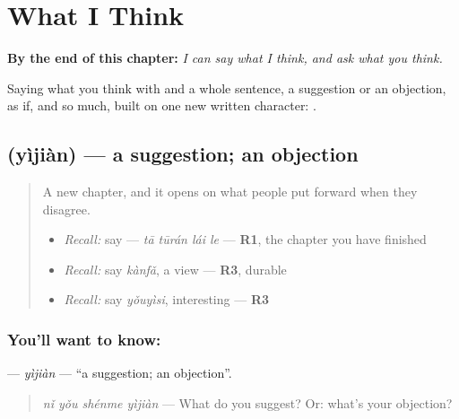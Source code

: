 
\chapter{What I Think}
\label{ch:zh-what-i-think}

\begin{chapteropening}
\textbf{By the end of this chapter:} \emph{I can say what I think, and ask what you think.}

Saying what you think with  and a whole sentence, a suggestion or an objection, as if, and so much, built on one new written character: .
\end{chapteropening}

\section[\texorpdfstring{\zh{意见} (yìjiàn)}{意见 (yìjiàn)}]{ (yìjiàn) — a suggestion; an objection}

\label{lesson:ZH-C280-yijian}



\begin{quote}
A new chapter, and it opens on what people put forward when they disagree.

\begin{itemize}
\raggedright
  \item \emph{Recall:} say  — \emph{tā tūrán lái le} — \textbf{R1}, the chapter you have finished
  \item \emph{Recall:} say \emph{kànfǎ}, a view — \textbf{R3}, durable
  \item \emph{Recall:} say \emph{yǒuyìsi}, interesting — \textbf{R3}
\end{itemize}
\end{quote}

\subsection*{You'll want to know: }
\textbf{} — \emph{yìjiàn} — \textquotedblleft{}a suggestion; an objection\textquotedblright{}.

\begin{quote}
\textbf{} \emph{nǐ yǒu shénme yìjiàn} — What do you suggest? Or: what's your objection?
\end{quote}

